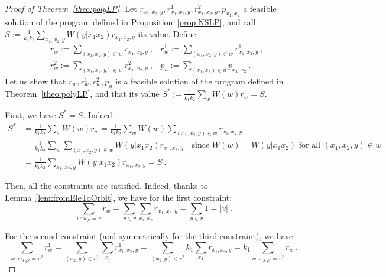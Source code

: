 \documentclass[11pt]{article}
\theoremstyle{definition}
\theoremstyle{remark}
\begin{document}
\begin{proof}[Proof of Theorem~\ref{theo:polyLP}]
  Let $r_{x_1,x_2,y},r^1_{x_1,x_2,y},r^2_{x_1,x_2,y},p_{x_1,x_2}$ a feasible solution of the program defined in Proposition~\ref{prop:NSLP}, and call $S:=\frac{1}{k_1k_2} \sum_{x_1,x_2,y} W(y|x_1x_2)r_{x_1,x_2,y}$ its value. Define:
  \begin{equation}
    \begin{aligned}
      &r_w := \sum_{(x_1,x_2,y) \in w} r_{x_1,x_2,y} \ , &r^1_w := \sum_{(x_1,x_2,y) \in w} r^1_{x_1,x_2,y} \ ,\\
      &r^2_w := \sum_{(x_1,x_2,y) \in w} r^2_{x_1,x_2,y} \ , &p_u := \sum_{(x_1,x_2) \in u} p_{x_1,x_2} \ .
    \end{aligned}
  \end{equation}
  Let us show that $r_w,r^1_w,r^2_w,p_u$ is a feasible solution of the program defined in Theorem~\ref{theo:polyLP}, and that its value $S^*:=\frac{1}{k_1k_2}\sum_{w} W(w)r_w = S$.

  First, we have  $S^* = S$. Indeed:
   \begin{equation}
     \begin{aligned}
       S^*&=\frac{1}{k_1k_2}\sum_{w} W(w)r_w =\frac{1}{k_1k_2}\sum_{w} W(w) \sum_{(x_1,x_2,y) \in w} r_{x_1,x_2,y}\\
       &=\frac{1}{k_1k_2}\sum_{w} \sum_{(x_1,x_2,y) \in w} W(y|x_1x_2) r_{x_1,x_2,y} \quad \text{since $W(w)= W(y|x_1x_2)$ for all $(x_1,x_2,y) \in w$}\\
       &= \frac{1}{k_1k_2}\sum_{x_1,x_2,y} W(y|x_1x_2) r_{x_1,x_2,y} = S \ .
     \end{aligned}
  \end{equation}

   Then, all the constraints are satisfied. Indeed, thanks to Lemma~\ref{lem:fromEleToOrbit}, we have for the first constraint:
   \[ \sum_{w:w_{\mathcal{Y}}=v} r_w = \sum_{y \in v} \sum_{x_1,x_2} r_{x_1,x_2,y} = \sum_{y \in v} 1 = |v| \ .\]

   For the second constraint (and symmetrically for the third constraint), we have:
   \[ \sum_{w:w_{\mathcal{X}_2\mathcal{Y}}=v^2} r^1_{w} = \sum_{(x_2,y) \in v^2} \sum_{x_1} r^1_{x_1,x_2,y} = \sum_{(x_2,y) \in v^2} k_1 \sum_{x_1} r_{x_1,x_2,y} = k_1\sum_{w:w_{\mathcal{X}_2\mathcal{Y}}=v^2} r_{w} \ .\]
   

\end{proof}
\end{document}
